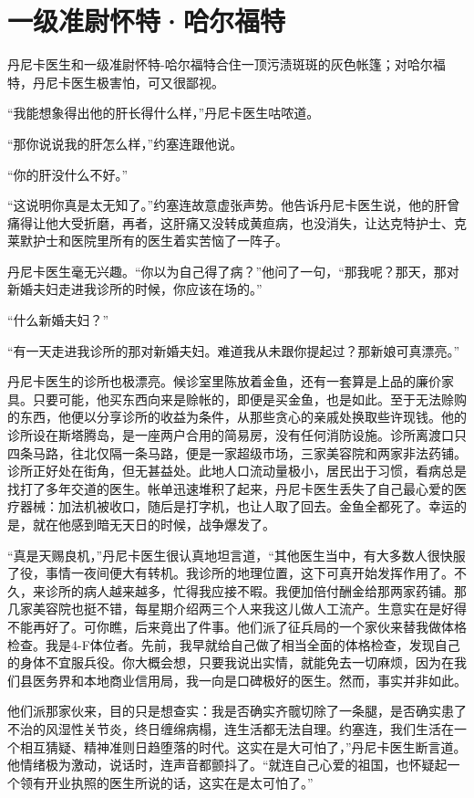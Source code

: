 \chapter{一级准尉怀特·哈尔福特}

 
    丹尼卡医生和一级准尉怀特-哈尔福特合住一顶污渍斑斑的灰色帐篷；对哈尔福特，丹尼卡医生极害怕，可又很鄙视。

    “我能想象得出他的肝长得什么样，”丹尼卡医生咕哝道。

    “那你说说我的肝怎么样，”约塞连跟他说。

    “你的肝没什么不好。”

    “这说明你真是太无知了。”约塞连故意虚张声势。他告诉丹尼卡医生说，他的肝曾痛得让他大受折磨，再者，这肝痛又没转成黄疸病，也没消失，让达克特护士、克莱默护士和医院里所有的医生着实苦恼了一阵子。

    丹尼卡医生毫无兴趣。“你以为自己得了病？”他问了一句，“那我呢？那天，那对新婚夫妇走进我诊所的时候，你应该在场的。”

    “什么新婚夫妇？”

    “有一天走进我诊所的那对新婚夫妇。难道我从未跟你提起过？那新娘可真漂亮。”

    丹尼卡医生的诊所也极漂亮。候诊室里陈放着金鱼，还有一套算是上品的廉价家具。只要可能，他买东西向来是赊帐的，即便是买金鱼，也是如此。至于无法赊购的东西，他便以分享诊所的收益为条件，从那些贪心的亲戚处换取些许现钱。他的诊所设在斯塔腾岛，是一座两户合用的简易房，没有任何消防设施。诊所离渡口只四条马路，往北仅隔一条马路，便是一家超级市场，三家美容院和两家非法药铺。诊所正好处在街角，但无甚益处。此地人口流动量极小，居民出于习惯，看病总是找打了多年交道的医生。帐单迅速堆积了起来，丹尼卡医生丢失了自己最心爱的医疗器械：加法机被收口，随后是打字机，也让人取了回去。金鱼全都死了。幸运的是，就在他感到暗无天日的时候，战争爆发了。

    “真是天赐良机，”丹尼卡医生很认真地坦言道，“其他医生当中，有大多数人很快服了役，事情一夜间便大有转机。我诊所的地理位置，这下可真开始发挥作用了。不久，来诊所的病人越来越多，忙得我应接不暇。我便加倍付酬金给那两家药铺。那几家美容院也挺不错，每星期介绍两三个人来我这儿做人工流产。生意实在是好得不能再好了。可你瞧，后来竟出了件事。他们派了征兵局的一个家伙来替我做体格检查。我是4-F体位者。先前，我早就给自己做了相当全面的体格检查，发现自己的身体不宜服兵役。你大概会想，只要我说出实情，就能免去一切麻烦，因为在我们县医务界和本地商业信用局，我一向是口碑极好的医生。然而，事实并非如此。

 


    他们派那家伙来，目的只是想查实：我是否确实齐髋切除了一条腿，是否确实患了不治的风湿性关节炎，终日缠绵病榻，连生活都无法自理。约塞连，我们生活在一个相互猜疑、精神准则日趋堕落的时代。这实在是大可怕了，”丹尼卡医生断言道。他情绪极为激动，说话时，连声音都颤抖了。“就连自己心爱的祖国，也怀疑起一个领有开业执照的医生所说的话，这实在是太可怕了。”

